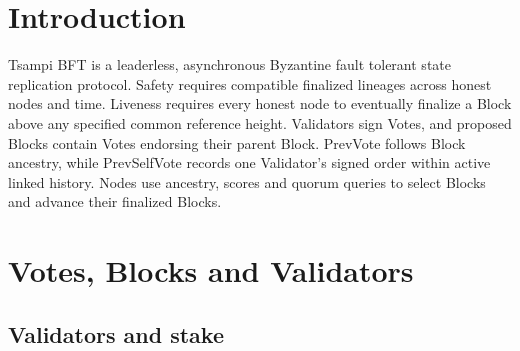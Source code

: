 
\section{Introduction}\label{sec:overview}

Tsampi BFT is a leaderless, asynchronous Byzantine fault tolerant state replication protocol.
Safety requires compatible finalized lineages across honest nodes and time.
Liveness requires every honest node to eventually finalize a Block above any specified common reference height.
Validators sign Votes, and proposed Blocks contain Votes endorsing their parent Block.
PrevVote follows Block ancestry, while PrevSelfVote records one Validator's signed order within active linked history.
Nodes use ancestry, scores and quorum queries to select Blocks and advance their finalized Blocks.

\section{Votes, Blocks and Validators}\label{sec:objects}

\subsection{Validators and stake}


